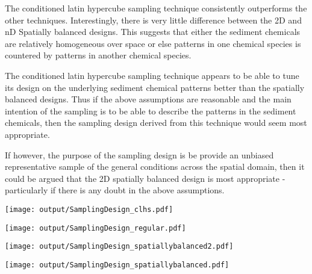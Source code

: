 \documentclass[a4paper]{article}
\let\origfigure=\figure
\let\endorigfigure=\endfigure
\renewenvironment{figure}[1][]{%
   \origfigure[H]
}{%
   \endorigfigure
}
\begin{document}
The conditioned latin hypercube sampling technique consistently
outperforms the other techniques. Interestingly, there is very little
difference between the 2D and nD Spatially balanced designs. This
suggests that either the sediment chemicals are relatively homogeneous
over space or else patterns in one chemical species is countered by
patterns in another chemical species.

The conditioned latin hypercube sampling technique appears to be able to
tune its design on the underlying sediment chemical patterns better than
the spatially balanced designs. Thus if the above assumptions are
reasonable and the main intention of the sampling is to be able to
describe the patterns in the sediment chemicals, then the sampling
design derived from this technique would seem most appropriate.

If however, the purpose of the sampling design is be provide an unbiased
representative sample of the general conditions across the spatial
domain, then it could be argued that the 2D spatially balanced design is
most appropriate - particularly if there is any doubt in the above
assumptions.

\begin{figure}
\centering\scriptsize
\texttt{[image: output/SamplingDesign\_clhs.pdf]}
\caption{Sampling configurations associated with the lowest mean Error
for each sample size for cLHS for the East
Arm\label{fig:SamplingDesign_clhs}}
\end{figure}

\begin{figure}
\centering\scriptsize
\texttt{[image: output/SamplingDesign\_regular.pdf]}
\caption{Sampling configurations associated with the lowest mean Error
for each sample size for Regular grid sampling for the East
Arm\label{fig:SamplingDesign_regular}}
\end{figure}

\begin{figure}
\centering\scriptsize
\texttt{[image: output/SamplingDesign\_spatiallybalanced2.pdf]}
\caption{Sampling configurations associated with the lowest mean Error
for each sample size for nD Spatially balanced sampling for the East
Arm\label{fig:SamplingDesignspatiallybalanced2}}
\end{figure}

\begin{figure}
\centering\scriptsize
\texttt{[image: output/SamplingDesign\_spatiallybalanced.pdf]}
\caption{Sampling configurations associated with the lowest mean Error
for each sample size for 2D Spatially balanced sampling for the East
Arm\label{fig:SamplingDesignspatiallybalanced}}
\end{figure}
\end{document}
